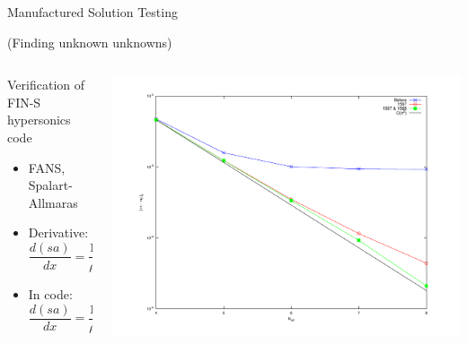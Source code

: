 \documentclass[mathserif]{beamer}
\begin{document}
\begin{frame}{Manufactured Solution Testing}

  (Finding unknown unknowns)

  \begin{columns}[c]
    \begin{column}{6cm}

      \begin{block}{Verification of FIN-S hypersonics code}
        \small
        \begin{itemize}
        \item \small FANS, Spalart-Allmaras
          
        \item Derivative:
          \begin{equation}
            \nonumber  
            \frac{d(sa)}{dx} = \frac{1}{\rho}*\left(\frac{d(\rho *sa)}{dx} - sa \frac{d\rho}{dx}\right)
          \end{equation}
          
        \item In code:
          \begin{equation}
            \nonumber  
            \frac{d(sa)}{dx} = \frac{1}{\rho}*\frac{d(\rho *sa)}{dx} - sa \frac{d \rho}{dx}
          \end{equation}
          
        \end{itemize}
      \end{block}
    \end{column}

    \begin{column}{5cm}
      \begin{center}
        \includegraphics[scale=.3]{sa_bug} \\
      \end{center}
    \end{column}


\end{columns}
\end{frame}
\end{document}
